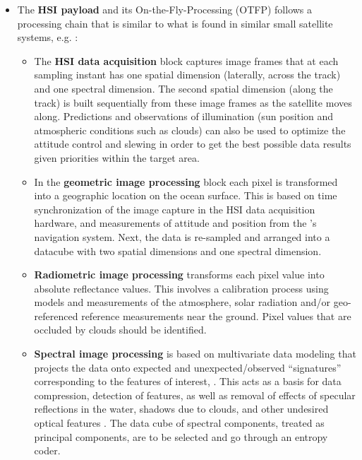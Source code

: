 \begin{itemize}

\item The {\bf \hypso HSI payload} and its On-the-Fly-Processing (OTFP) follows
  a processing chain that is similar to what is found in similar small
  satellite systems, e.g. \cite{Sou16}:

  \begin{itemize} 

  \item The {\bf HSI data acquisition} block captures image frames
    that at each sampling instant has one spatial dimension
    (laterally, across the track) and one spectral dimension. The
    second spatial dimension (along the track) is built sequentially
    from these image frames as the satellite moves along. Predictions
    and observations of illumination (sun position and atmospheric
    conditions such as clouds) can also be used to optimize the
    attitude control and slewing in order to get the best possible
    data results given priorities within the target area.

  \item In the {\bf geometric image processing} block each pixel is
    transformed into a geographic location on the ocean surface. This
    is based on time synchronization of the image capture in the HSI
    data acquisition hardware, and measurements of attitude and
    position from the \hypsoe's navigation system. Next, the data is
    re-sampled and arranged into a datacube with two spatial dimensions
    and one spectral dimension.

  \item {\bf Radiometric image processing} transforms each pixel value
    into absolute reflectance values. This involves a calibration
    process using models and measurements of the atmosphere, solar
    radiation and/or geo-referenced reference measurements near the
    ground. Pixel values that are occluded by clouds should be
    identified.

  \item {\bf Spectral image processing} is based on multivariate data
    modeling that projects the data onto expected and
    unexpected/observed ``signatures'' corresponding to the features
    of interest, \cite{Vit17}. This acts as a basis for data compression,
    detection of features, as well as removal of effects of specular
    reflections in the water, shadows due to clouds, and other
    undesired optical features \cite{For17}. The data cube of spectral components, treated as principal components, are to be selected and go through an entropy coder.


\end{itemize}
\end{itemize}
